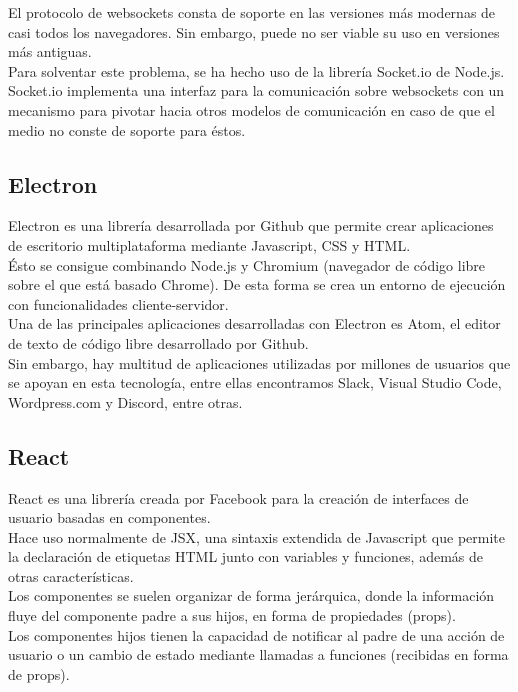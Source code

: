 El protocolo de websockets consta de soporte en las versiones más modernas de casi todos los navegadores. Sin embargo, puede no ser viable su uso en versiones más antiguas. \\

Para solventar este problema, se ha hecho uso de la librería Socket.io de Node.js. \\ 
Socket.io implementa una interfaz para la comunicación sobre websockets con un mecanismo para pivotar hacia otros modelos de comunicación en caso de que el medio no conste de soporte para éstos. \\
\subsection {Electron}

Electron es una librería desarrollada por Github que permite crear aplicaciones de escritorio multiplataforma mediante Javascript, CSS y HTML. \\
Ésto se consigue combinando Node.js y Chromium (navegador de código libre sobre el que está basado Chrome). De esta forma se crea un entorno de ejecución con funcionalidades cliente-servidor. \\

Una de las principales aplicaciones desarrolladas con Electron es Atom, el editor de texto de código libre desarrollado por Github. \\ Sin embargo, hay multitud de aplicaciones utilizadas por millones de usuarios que se apoyan en esta tecnología, entre ellas encontramos Slack, Visual Studio Code, Wordpress.com y Discord, entre otras. \\

\subsection {React}

React es una librería creada por Facebook para la creación de interfaces de usuario basadas en componentes. \\
Hace uso normalmente de JSX, una sintaxis extendida de Javascript que permite la declaración de etiquetas HTML junto con variables y funciones, además de otras características. \\

Los componentes se suelen organizar de forma jerárquica, donde la información fluye del componente padre a sus hijos, en forma de propiedades (props). \\ Los componentes hijos tienen la capacidad de notificar al padre de una acción de usuario o un cambio de estado mediante llamadas a funciones (recibidas en forma de props).\\

